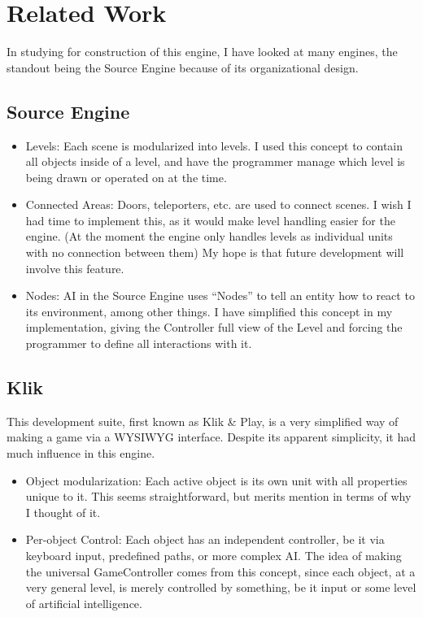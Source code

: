\documentclass[12pt]{article}
\begin{document}
  \section{Related Work}

In studying for construction of this engine, I have looked at many engines, the standout being the Source Engine because of its organizational design.

\subsection{Source Engine}
\begin{itemize}
 \item Levels: Each scene is modularized into levels. I used this concept to contain all objects inside of a level, and have the programmer manage which level is being drawn or operated on at the time.
 \item Connected Areas: Doors, teleporters, etc. are used to connect scenes. I wish I had time to implement this, as it would make level handling easier for the engine. (At the moment the engine only handles levels as individual units with no connection between them) My hope is that future development will involve this feature.
 \item Nodes: AI in the Source Engine uses ``Nodes'' to tell an entity how to react to its environment, among other things. I have simplified this concept in my implementation, giving the Controller full view of the Level and forcing the programmer to define all interactions with it.
\end{itemize}

\subsection{Klik}
This development suite, first known as Klik \& Play, is a very simplified way of making a game via a WYSIWYG interface. Despite its apparent simplicity, it had much influence in this engine.

\begin{itemize}
 \item Object modularization: Each active object is its own unit with all properties unique to it. This seems straightforward, but merits mention in terms of why I thought of it.
 \item Per-object Control: Each object has an independent controller, be it via keyboard input, predefined paths, or more complex AI. The idea of making the universal GameController comes from this concept, since each object, at a very general level, is merely controlled by something, be it input or some level of artificial intelligence.
\end{itemize}
\end{document}
